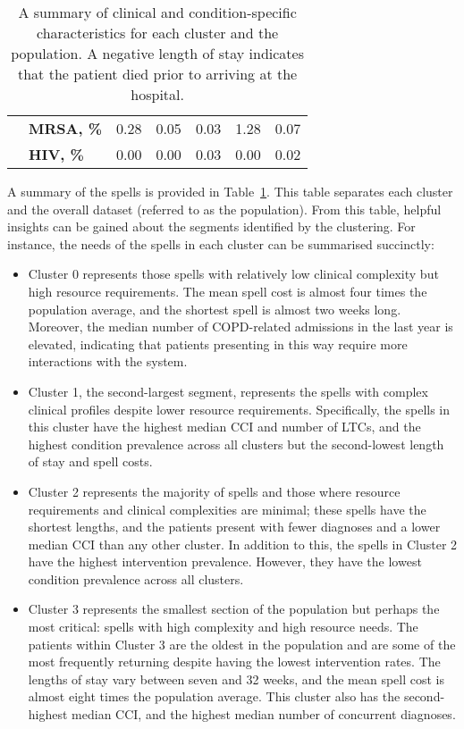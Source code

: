 \documentclass[11pt]{article}
\begin{document}
\begin{table}
{\begin{tabular}{llrrrrr}
               & \textbf{MRSA, \%} &     0.28 &     0.05 &     0.03 &      1.28 &       0.07 \\
               & \textbf{HIV, \%} &     0.00 &     0.00 &     0.03 &      0.00 &       0.02 \\
        \bottomrule
        \end{tabular}
    }\caption{%
        A summary of clinical and condition-specific characteristics for each
        cluster and the population. A negative length of stay indicates that the
        patient died prior to arriving at the hospital.
    }\label{tab:summary}
\end{table}

A summary of the spells is provided in Table~\ref{tab:summary}. This table
separates each cluster and the overall dataset (referred to as the population).
From this table, helpful insights can be gained about the segments identified by
the clustering. For instance, the needs of the spells in each cluster can be
summarised succinctly:
\begin{itemize}
    \item Cluster 0 represents those spells with relatively low clinical
        complexity but high resource requirements. The mean spell cost is almost
        four times the population average, and the shortest spell is almost two
        weeks long. Moreover, the median number of COPD-related admissions in
        the last year is elevated, indicating that patients presenting in this
        way require more interactions with the system.
    \item Cluster 1, the second-largest segment, represents the spells with
        complex clinical profiles despite lower resource requirements.
        Specifically, the spells in this cluster have the highest median CCI and
        number of LTCs, and the highest condition prevalence across all clusters
        but the second-lowest length of stay and spell costs.
    \item Cluster 2 represents the majority of spells and those where resource
        requirements and clinical complexities are minimal; these spells have
        the shortest lengths, and the patients present with fewer diagnoses and
        a lower median CCI than any other cluster. In addition to this, the
        spells in Cluster 2 have the highest intervention prevalence. However,
        they have the lowest condition prevalence across all clusters.
    \item Cluster 3 represents the smallest section of the population but
        perhaps the most critical: spells with high complexity and high resource
        needs. The patients within Cluster 3 are the oldest in the population
        and are some of the most frequently returning despite having the lowest
        intervention rates. The lengths of stay vary between seven and 32 weeks,
        and the mean spell cost is almost eight times the population average.
        This cluster also has the second-highest median CCI, and the highest
        median number of concurrent diagnoses.
\end{itemize}
\end{document}
